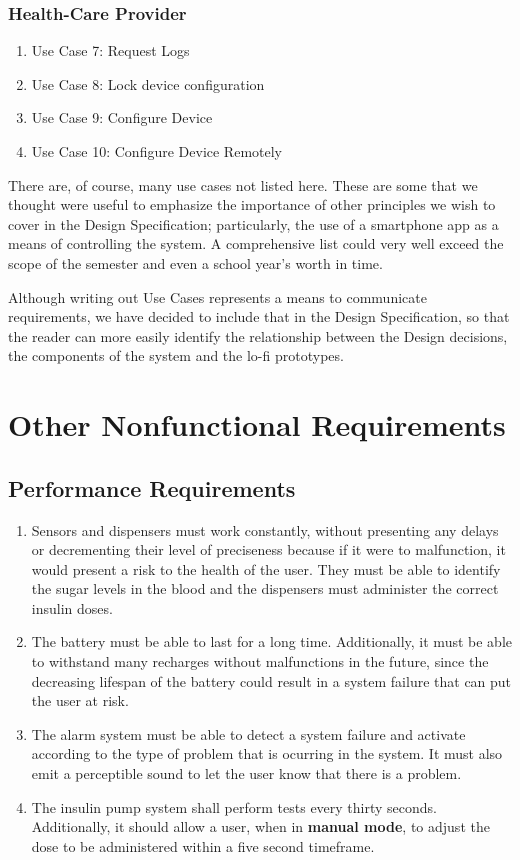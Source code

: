 \documentclass{scrreprt}
\begin{document}
\subsection{Health-Care Provider}
\begin{enumerate}
    \item Use Case 7: Request Logs
    \item Use Case 8: Lock device configuration
    \item Use Case 9: Configure Device
    \item Use Case 10: Configure Device Remotely
\end{enumerate}

There are, of course, many use cases not listed here. These are some that we thought were useful to emphasize the importance of other principles we wish to cover in the Design Specification; particularly, the use of 
a smartphone app as a means of controlling the system. A comprehensive list could very well exceed the scope of the semester and even a school year's worth in time. 

Although writing out Use Cases represents a means to communicate requirements, we have decided to include that in the Design Specification, so that the reader can
more easily identify the relationship between the Design decisions, the components of the system and the lo-fi prototypes.

\chapter{Other Nonfunctional Requirements}

\section{Performance Requirements}
\begin{enumerate}
  \item Sensors and dispensers must work constantly, without presenting any delays or decrementing their
    level of preciseness because if it were to malfunction, it would present a risk to the health of the
    \gls{user}. They must be able to identify the sugar levels in the blood and the dispensers must administer
    the correct \gls{insulin} doses. 
  \item The battery must be able to last for a long time. Additionally, it must be able to withstand
    many recharges without malfunctions in the future, since the decreasing lifespan of the battery 
    could result in a system failure that can put the \gls{user} at risk.
  \item The alarm system must be able to detect a system failure and activate according to the type of
    problem that is ocurring in the system. It must also emit a perceptible sound to let the \gls{user} know
    that there is a problem.
  \item The insulin pump system shall perform tests every thirty seconds. Additionally, it should allow 
    a \gls{user}, when in \textbf{manual mode}, to adjust the dose to be administered within a five second
    timeframe.

\end{enumerate}
\end{document}
